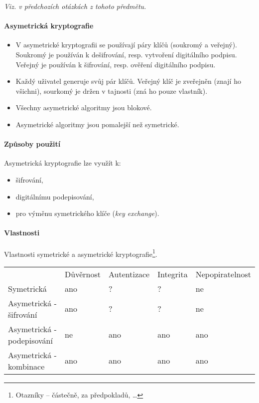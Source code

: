 \textit{Viz.  v předchozích otázkách z tohoto předmětu.}

\paragraph*{Asymetrická kryptografie} \begin{itemize}
    \item V asymetrické kryptografii se používají páry klíčů (soukromý a veřejný). Soukromý je používán k dešifrování, resp. vytvoření digitálního podpisu. Veřejný je používán k šifrování, resp. ověření digitálního podpisu.
    \item Každý uživatel generuje svůj pár klíčů. Veřejný klíč je zveřejněn (znají ho všichni), sourkomý je držen v tajnosti (zná ho pouze vlastník).
    \item Všechny asymetrické algoritmy jsou blokové.
    \item Asymetrické algoritmy jsou pomalejší než symetrické.
\end{itemize}

\paragraph*{Způsoby použití} Asymetrická kryptografie lze využít k: \begin{itemize}
    \item šifrování,
    \item digitálnímu podepisování,
    \item pro výměnu symetrického klíče (\textit{key exchange}).
\end{itemize}

\paragraph*{Vlastnosti} Vlastnosti symetrické a asymetrické kryptografie\footnote{Otazníky -- částečně, za předpokladů, \dots}.
\begin{table}[H]
\begin{tabular}{lllll}
& Důvěrnost & Autentizace & Integrita & Nepopiratelnost \\
Symetrická & ano & ? & ? & ne \\
Asymetrická - šifrování & ano & ? & ? & ne \\
Asymetrická - podepisování & ne & ano & ano & ano \\
Asymetrická - kombinace & ano & ano & ano & ano
\end{tabular}
\end{table}

